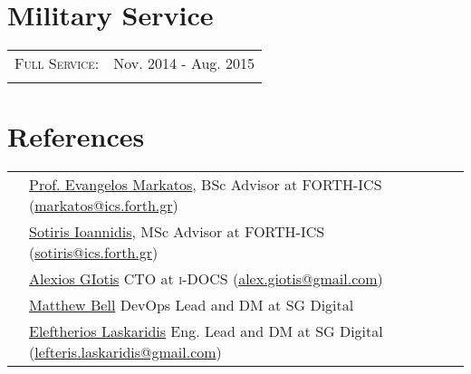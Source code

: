\documentclass[a4paper,10pt]{article} %
\begin{document}

\section{Military Service}

\begin{tabular}{rl}

\textsc{Full Service:} & Nov. 2014 - Aug. 2015 \\
\\

\end{tabular}


\section{References}

\begin{tabular}{rl}

& \href{https://www.ics.forth.gr/discs/person/Markatos/Evangelos\%20P.}{Prof. Evangelos Markatos}, BSc Advisor at \textsc{FORTH-ICS} (\href{mailto:markatos@ics.forth.gr}{markatos@ics.forth.gr}) \\
& \href{https://www.ics.forth.gr/discs/person/Ioannidis/\%CE\%A3\%CF\%89\%CF\%84\%CE\%AE\%CF\%81\%CE\%B9\%CE\%BF\%CF\%82}{Sotiris Ioannidis}, MSc Advisor at \textsc{FORTH-ICS} (\href{mailto:sotiris@ics.forth.gr}{sotiris@ics.forth.gr}) \\
& \href{https://www.linkedin.com/in/alexiosgiotis}{Alexios GIotis} CTO at \textsc{i-DOCS} (\href{mailto:alex.giotis@gmail.com}{alex.giotis@gmail.com}) \\
& \href{https://linkedin.com/in/matt-bell-18126341}{Matthew Bell} DevOps Lead and DM at SG Digital \\
& \href{https://linkedin.com/in/laskaridis}{Eleftherios Laskaridis} Eng. Lead and DM at SG Digital (\href{mailto:lefteris.laskaridis@gmail.com}{lefteris.laskaridis@gmail.com})

\end{tabular}
\end{document}
